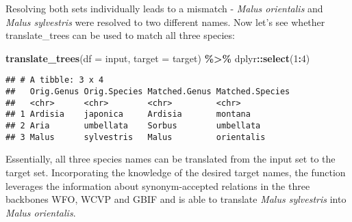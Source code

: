 \documentclass[
  11pt,
]{article}
\newenvironment{Shaded}{\begin{snugshade}}{\end{snugshade}}
\newcommand{\AttributeTok}[1]{\textcolor[rgb]{0.13,0.29,0.53}{#1}}
\newcommand{\DecValTok}[1]{\textcolor[rgb]{0.00,0.00,0.81}{#1}}
\newcommand{\FunctionTok}[1]{\textcolor[rgb]{0.13,0.29,0.53}{\textbf{#1}}}
\newcommand{\NormalTok}[1]{#1}
\newcommand{\SpecialCharTok}[1]{\textcolor[rgb]{0.81,0.36,0.00}{\textbf{#1}}}
\begin{document}
\normalsize

Resolving both sets individually leads to a mismatch - \emph{Malus
orientalis} and \emph{Malus sylvestris} were resolved to two different
names. Now let's see whether translate\_trees can be used to match all
three species: \small

\begin{Shaded}
\begin{Highlighting}[]
\FunctionTok{translate\_trees}\NormalTok{(}\AttributeTok{df =}\NormalTok{ input, }\AttributeTok{target =}\NormalTok{ target) }\SpecialCharTok{\%\textgreater{}\%} 
\NormalTok{  dplyr}\SpecialCharTok{::}\FunctionTok{select}\NormalTok{(}\DecValTok{1}\SpecialCharTok{:}\DecValTok{4}\NormalTok{) }
\end{Highlighting}
\end{Shaded}

\begin{verbatim}
## # A tibble: 3 x 4
##   Orig.Genus Orig.Species Matched.Genus Matched.Species
##   <chr>      <chr>        <chr>         <chr>          
## 1 Ardisia    japonica     Ardisia       montana        
## 2 Aria       umbellata    Sorbus        umbellata      
## 3 Malus      sylvestris   Malus         orientalis
\end{verbatim}

\normalsize

Essentially, all three species names can be translated from the input
set to the target set. Incorporating the knowledge of the desired target
names, the function leverages the information about synonym-accepted
relations in the three backbones WFO, WCVP and GBIF and is able to
translate \emph{Malus sylvestris} into \emph{Malus orientalis}.
\end{document}
